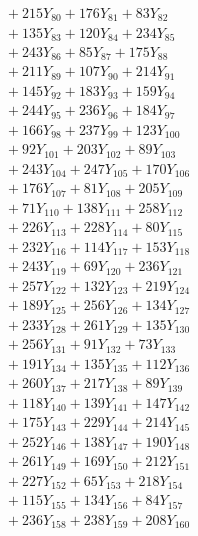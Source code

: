 \documentclass[a4paper,10pt]{article}
\begin{document}
{\begin{align}
&\;  + 215 Y_{80} + 176 Y_{81} + 83 Y_{82} \\[0.3ex]
&\;  + 135 Y_{83} + 120 Y_{84} + 234 Y_{85} \\[0.3ex]
&\;  + 243 Y_{86} + 85 Y_{87} + 175 Y_{88} \\[0.5ex]\allowbreak
&\;  + 211 Y_{89} + 107 Y_{90} + 214 Y_{91} \\[0.3ex]
&\;  + 145 Y_{92} + 183 Y_{93} + 159 Y_{94} \\[0.3ex]
&\;  + 244 Y_{95} + 236 Y_{96} + 184 Y_{97} \\[0.3ex]
&\;  + 166 Y_{98} + 237 Y_{99} + 123 Y_{100} \\[0.3ex]
&\;  + 92 Y_{101} + 203 Y_{102} + 89 Y_{103} \\[0.3ex]
&\;  + 243 Y_{104} + 247 Y_{105} + 170 Y_{106} \\[0.3ex]
&\;  + 176 Y_{107} + 81 Y_{108} + 205 Y_{109} \\[0.3ex]
&\;  + 71 Y_{110} + 138 Y_{111} + 258 Y_{112} \\[0.3ex]
&\;  + 226 Y_{113} + 228 Y_{114} + 80 Y_{115} \\[0.3ex]
&\;  + 232 Y_{116} + 114 Y_{117} + 153 Y_{118} \\[0.5ex]\allowbreak
&\;  + 243 Y_{119} + 69 Y_{120} + 236 Y_{121} \\[0.3ex]
&\;  + 257 Y_{122} + 132 Y_{123} + 219 Y_{124} \\[0.3ex]
&\;  + 189 Y_{125} + 256 Y_{126} + 134 Y_{127} \\[0.3ex]
&\;  + 233 Y_{128} + 261 Y_{129} + 135 Y_{130} \\[0.3ex]
&\;  + 256 Y_{131} + 91 Y_{132} + 73 Y_{133} \\[0.3ex]
&\;  + 191 Y_{134} + 135 Y_{135} + 112 Y_{136} \\[0.3ex]
&\;  + 260 Y_{137} + 217 Y_{138} + 89 Y_{139} \\[0.3ex]
&\;  + 118 Y_{140} + 139 Y_{141} + 147 Y_{142} \\[0.3ex]
&\;  + 175 Y_{143} + 229 Y_{144} + 214 Y_{145} \\[0.3ex]
&\;  + 252 Y_{146} + 138 Y_{147} + 190 Y_{148} \\[0.5ex]\allowbreak
&\;  + 261 Y_{149} + 169 Y_{150} + 212 Y_{151} \\[0.3ex]
&\;  + 227 Y_{152} + 65 Y_{153} + 218 Y_{154} \\[0.3ex]
&\;  + 115 Y_{155} + 134 Y_{156} + 84 Y_{157} \\[0.3ex]
&\;  + 236 Y_{158} + 238 Y_{159} + 208 Y_{160} \\[0.3ex]

\end{align}}
\end{document}
